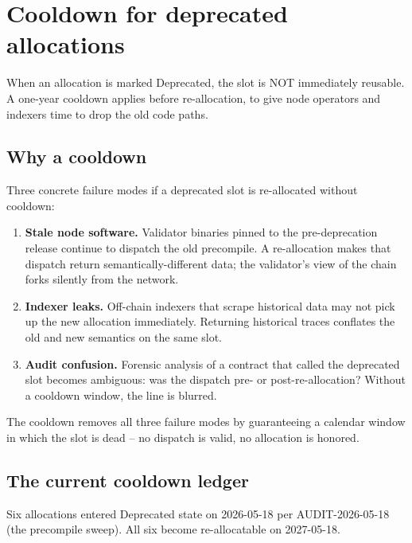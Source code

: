 \section{Cooldown for deprecated allocations}
\label{sec:cooldown}

When an allocation is marked Deprecated, the slot is NOT immediately
reusable. A one-year cooldown applies before re-allocation, to give
node operators and indexers time to drop the old code paths.

\subsection{Why a cooldown}

Three concrete failure modes if a deprecated slot is re-allocated
without cooldown:

\begin{enumerate}[leftmargin=2em,nosep]
\item \textbf{Stale node software.} Validator binaries pinned to the
  pre-deprecation release continue to dispatch the old precompile.
  A re-allocation makes that dispatch return semantically-different
  data; the validator's view of the chain forks silently from the
  network.
\item \textbf{Indexer leaks.} Off-chain indexers that scrape
  historical data may not pick up the new allocation immediately.
  Returning historical traces conflates the old and new semantics
  on the same slot.
\item \textbf{Audit confusion.} Forensic analysis of a contract that
  called the deprecated slot becomes ambiguous: was the dispatch
  pre- or post-re-allocation? Without a cooldown window, the line is
  blurred.
\end{enumerate}

The cooldown removes all three failure modes by guaranteeing a
calendar window in which the slot is dead -- no dispatch is valid,
no allocation is honored.

\subsection{The current cooldown ledger}

Six allocations entered Deprecated state on 2026-05-18 per
AUDIT-2026-05-18 (the precompile sweep). All six become re-allocatable
on 2027-05-18.

